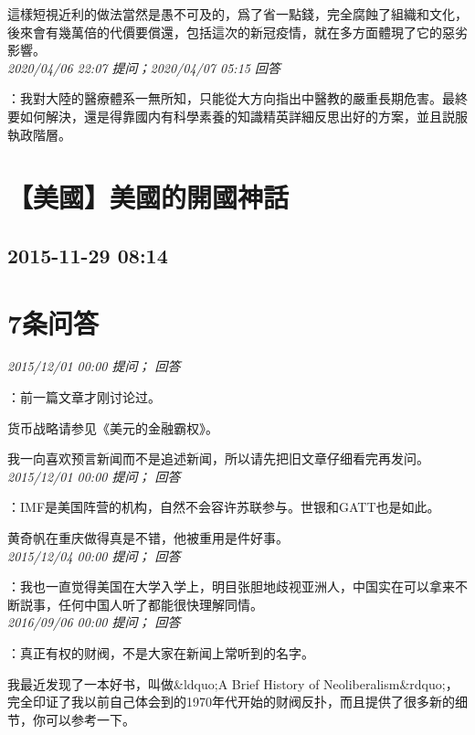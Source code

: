 \documentclass[twocolumn]{ctexart}
\begin{document}
這樣短視近利的做法當然是愚不可及的，爲了省一點錢，完全腐蝕了組織和文化，後來會有幾萬倍的代價要償還，包括這次的新冠疫情，就在多方面體現了它的惡劣影響。
\\

\textit{\hfill\noindent\small 2020/04/06 22:07 提问；2020/04/07 05:15 回答}

：我對大陸的醫療體系一無所知，只能從大方向指出中醫教的嚴重長期危害。最終要如何解決，還是得靠國内有科學素養的知識精英詳細反思出好的方案，並且説服執政階層。
\\


\section{【美國】美國的開國神話}
\subsection{2015-11-29 08:14}


\section{7条问答}

\textit{\hfill\noindent\small 2015/12/01 00:00 提问； 回答}

：前一篇文章才刚讨论过。

货币战略请参见《美元的金融霸权》。

我一向喜欢预言新闻而不是追述新闻，所以请先把旧文章仔细看完再发问。\\

\textit{\hfill\noindent\small 2015/12/01 00:00 提问； 回答}

：IMF是美国阵营的机构，自然不会容许苏联参与。世银和GATT也是如此。

黄奇帆在重庆做得真是不错，他被重用是件好事。\\

\textit{\hfill\noindent\small 2015/12/04 00:00 提问； 回答}

：我也一直觉得美国在大学入学上，明目张胆地歧视亚洲人，中国实在可以拿来不断説事，任何中国人听了都能很快理解同情。\\

\textit{\hfill\noindent\small 2016/09/06 00:00 提问； 回答}

：真正有权的财阀，不是大家在新闻上常听到的名字。

我最近发现了一本好书，叫做\&ldquo;A Brief History of Neoliberalism\&rdquo;，完全印证了我以前自己体会到的1970年代开始的财阀反扑，而且提供了很多新的细节，你可以参考一下。\\
\end{document}
